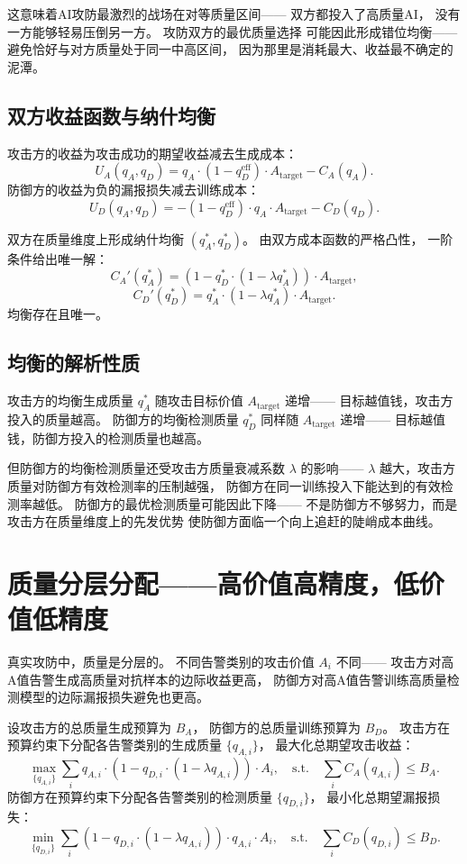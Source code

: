 \documentclass[11pt,a4paper]{article}
\begin{document}
这意味着AI攻防最激烈的战场在对等质量区间——
双方都投入了高质量AI，
没有一方能够轻易压倒另一方。
攻防双方的最优质量选择
可能因此形成错位均衡——
避免恰好与对方质量处于同一中高区间，
因为那里是消耗最大、收益最不确定的泥潭。

\subsection{双方收益函数与纳什均衡}

攻击方的收益为攻击成功的期望收益减去生成成本：
\[
U_A(q_A, q_D) = q_A \cdot (1 - q_D^{\text{eff}}) \cdot A_{\text{target}} - C_A(q_A).
\]
防御方的收益为负的漏报损失减去训练成本：
\[
U_D(q_A, q_D) = - (1 - q_D^{\text{eff}}) \cdot q_A \cdot A_{\text{target}} - C_D(q_D).
\]

双方在质量维度上形成纳什均衡 \((q_A^*, q_D^*)\)。
由双方成本函数的严格凸性，
一阶条件给出唯一解：
\[
C_A'(q_A^*) = (1 - q_D^* \cdot (1 - \lambda q_A^*)) \cdot A_{\text{target}},
\]
\[
C_D'(q_D^*) = q_A^* \cdot (1 - \lambda q_A^*) \cdot A_{\text{target}}.
\]
均衡存在且唯一。

\subsection{均衡的解析性质}

攻击方的均衡生成质量 \(q_A^*\) 随攻击目标价值 \(A_{\text{target}}\) 递增——
目标越值钱，攻击方投入的质量越高。
防御方的均衡检测质量 \(q_D^*\) 同样随 \(A_{\text{target}}\) 递增——
目标越值钱，防御方投入的检测质量也越高。

但防御方的均衡检测质量还受攻击方质量衰减系数 \(\lambda\) 的影响——
\(\lambda\) 越大，攻击方质量对防御方有效检测率的压制越强，
防御方在同一训练投入下能达到的有效检测率越低。
防御方的最优检测质量可能因此下降——
不是防御方不够努力，而是攻击方在质量维度上的先发优势
使防御方面临一个向上追赶的陡峭成本曲线。

\section{质量分层分配——高价值高精度，低价值低精度}

真实攻防中，质量是分层的。
不同告警类别的攻击价值 \(A_i\) 不同——
攻击方对高A值告警生成高质量对抗样本的边际收益更高，
防御方对高A值告警训练高质量检测模型的边际漏报损失避免也更高。

设攻击方的总质量生成预算为 \(B_A\)，
防御方的总质量训练预算为 \(B_D\)。
攻击方在预算约束下分配各告警类别的生成质量 \(\{q_{A,i}\}\)，
最大化总期望攻击收益：
\[
\max_{\{q_{A,i}\}} \sum_i q_{A,i} \cdot (1 - q_{D,i} \cdot (1 - \lambda q_{A,i})) \cdot A_i,
\quad \text{s.t.} \quad \sum_i C_A(q_{A,i}) \le B_A.
\]
防御方在预算约束下分配各告警类别的检测质量 \(\{q_{D,i}\}\)，
最小化总期望漏报损失：
\[
\min_{\{q_{D,i}\}} \sum_i (1 - q_{D,i} \cdot (1 - \lambda q_{A,i})) \cdot q_{A,i} \cdot A_i,
\quad \text{s.t.} \quad \sum_i C_D(q_{D,i}) \le B_D.
\]
\end{document}
